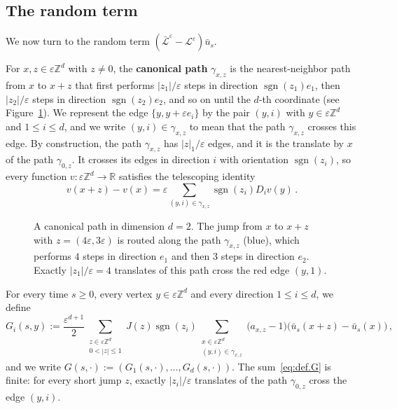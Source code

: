 \documentclass[11pt]{amsart}
\numberwithin{equation}{section}
\newcommand{\Z}{\mathbb{Z}}
\newcommand{\R}{\mathbb{R}}
\newcommand{\eps}{\varepsilon}
\newcommand{\Leps}{\mathcal{L}^\varepsilon}
\newcommand{\Lbar}{\bar{\mathcal{L}}^\varepsilon}
\newcommand{\sgn}{\operatorname{sgn}}
\begin{document}
\subsection{The random term} \label{sec:forcing}

We now turn to the random term $(\Lbar - \Leps) \bar u_s$.

For $x, z \in \eps \Z^d$ with $z \neq 0$, the \textbf{canonical path} $\gamma_{x,z}$ is the nearest-neighbor path from $x$ to $x + z$ that first performs $|z_1|/\eps$ steps in direction $\sgn(z_1) e_1$, then $|z_2|/\eps$ steps in direction $\sgn(z_2) e_2$, and so on until the $d$-th coordinate (see Figure~\ref{fig:path}).
We represent the edge $\{y, y + \eps e_i\}$ by the pair $(y,i)$ with $y \in \eps \Z^d$ and $1 \leq i \leq d$, and we write $(y, i) \in \gamma_{x,z}$ to mean that the path $\gamma_{x,z}$ crosses this edge.
By construction, the path $\gamma_{x,z}$ has $|z|_1/\eps$ edges, and it is the translate by $x$ of the path $\gamma_{0,z}$.
It crosses its edges in direction $i$ with orientation $\sgn(z_i)$, so every function $v \colon \eps \Z^d \to \R$ satisfies the telescoping identity
\begin{equation} \label{eq:telescoping}
    v(x + z) - v(x) = \eps \sum_{(y,i) \in \gamma_{x,z}} \sgn(z_i) D_i v(y)\,.
\end{equation}

\begin{figure}[ht]
\centering
{}
\caption{A canonical path in dimension $d = 2$. The jump from $x$ to $x + z$ with $z = (4 \eps, 3 \eps)$ is routed along the path $\gamma_{x,z}$ (blue), which performs $4$ steps in direction $e_1$ and then $3$ steps in direction $e_2$. Exactly $|z_1|/\eps = 4$ translates of this path cross the red edge $(y,1)$.}
\label{fig:path}
\end{figure}

For every time $s \geq 0$, every vertex $y \in \eps \Z^d$ and every direction $1 \leq i \leq d$, we define
\begin{equation} \label{eq:def.G}
    G_i(s, y) := \frac{\eps^{d+1}}{2} \sum_{\substack{z \in \eps \Z^d \\ 0 < |z| \leq 1}} J(z) \sgn(z_i) \sum_{\substack{x \in \eps \Z^d \\ (y,i) \in \gamma_{x,z}}} \bigl( a_{x,z} - 1 \bigr) \bigl( \bar u_s(x + z) - \bar u_s(x) \bigr)\,,
\end{equation}
and we write $G(s, \cdot) := (G_1(s, \cdot), \ldots, G_d(s, \cdot))$.
The sum~\eqref{eq:def.G} is finite: for every short jump $z$, exactly $|z_i|/\eps$ translates of the path $\gamma_{0,z}$ cross the edge $(y,i)$.
\end{document}
